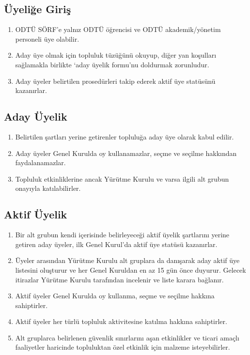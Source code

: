 \documentclass[11pt,a4paper]{article}
\begin{document}
\subsection{Üyeliğe Giriş}
\begin{enumerate}
    \item ODTÜ SÖRF’e yalnız ODTÜ öğrencisi ve ODTÜ akademik/yönetim personeli üye olabilir.
    \item Aday üye olmak için topluluk tüzüğünü okuyup, diğer yan koşulları sağlamakla birlikte ‘aday üyelik formu’nu doldurmak zorunludur.
    \item Aday üyeler belirtilen prosedürleri takip ederek aktif üye statüsünü kazanırlar.
\end{enumerate}

\subsection{Aday Üyelik}
\begin{enumerate}
    \item Belirtilen şartları yerine getirenler topluluğa aday üye olarak kabul edilir.
    \item Aday üyeler Genel Kurulda oy kullanamazlar, seçme ve seçilme hakkından faydalanamazlar.
    \item Topluluk etkinliklerine ancak Yürütme Kurulu ve varsa ilgili alt grubun onayıyla katılabilirler.
\end{enumerate}

\subsection{Aktif Üyelik}
\begin{enumerate}
    \item Bir alt grubun kendi içerisinde belirleyeceği aktif üyelik şartlarını yerine getiren aday üyeler, ilk Genel Kurul'da aktif üye statüsü kazanırlar.
    \item Üyeler arasından Yürütme Kurulu alt gruplara da danışarak aday aktif üye listesini oluşturur ve her Genel Kuruldan en az 15 gün önce duyurur. Gelecek itirazlar Yürütme Kurulu tarafından incelenir ve liste karara bağlanır.
    \item Aktif üyeler Genel Kurulda oy kullanma, seçme ve seçilme hakkına sahiptirler.
    \item Aktif üyeler her türlü topluluk aktivitesine katılma hakkına sahiptirler.
    \item Alt gruplarca belirlenen güvenlik sınırlarını aşan etkinlikler ve ticari amaçlı faaliyetler haricinde topluluktan özel etkinlik için malzeme isteyebilirler.
\end{enumerate}
\end{document}
